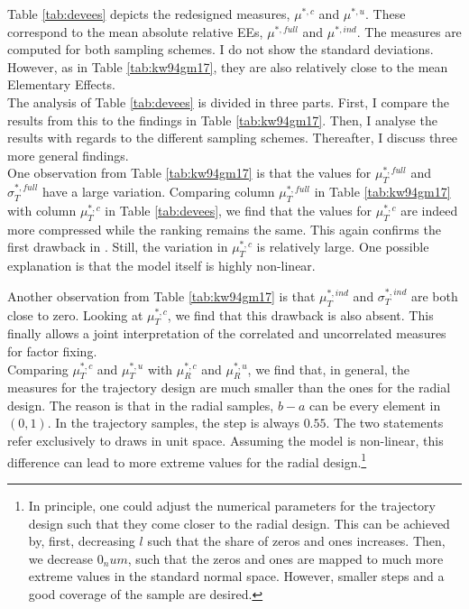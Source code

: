 \noindent
Table \ref{tab:devees} depicts the redesigned measures, $\mu^{*,c}$ and $\mu^{*,u}$. These correspond to the mean absolute relative EEs, $\mu^{*,full}$ and $\mu^{*,ind}$. The measures are computed for both sampling schemes. I do not show the standard deviations. However, as in Table \ref{tab:kw94gm17}, they are also relatively close to the mean Elementary Effects.\\

\noindent
The analysis of Table \ref{tab:devees} is divided in three parts. First, I compare the results from this to the findings in Table \ref{tab:kw94gm17}. Then, I analyse the results with regards to the different sampling schemes. Thereafter, I discuss three more general findings.\\

\noindent
One observation from Table \ref{tab:kw94gm17} is that the values for $\mu^{*,full}_T$ and $\sigma^{*,full}_T$ have a large variation. Comparing column $\mu^{*,full}_T$ in Table \ref{tab:kw94gm17} with column $\mu^{*,c}_T$ in Table \ref{tab:devees}, we find that the values for $\mu^{*,c}_T$ are indeed more compressed while the ranking remains the same. This again confirms the first drawback in \cite{ge2017extending}. Still, the variation in $\mu^{*,c}_T$ is relatively large. One possible explanation is that the model itself is highly non-linear.

Another observation from Table \ref{tab:kw94gm17} is that $\mu^{*,ind}_T$ and $\sigma^{*,ind}_T$ are both close to zero. Looking at $\mu^{*,c}_T$, we find that this drawback is also absent. This finally allows a joint interpretation of the correlated and uncorrelated measures for factor fixing.\\

\noindent
Comparing $\mu^{*,c}_T$ and $\mu^{*,u}_T$ with $\mu^{*,c}_R$ and $\mu^{*,u}_R$, we find that, in general, the measures for the trajectory design are much smaller than the ones for the radial design. The reason is that in the radial samples, $b-a$ can be every element in $(0,1)$. In the trajectory samples, the step is always $0.55$. The two statements refer exclusively to draws in unit space. Assuming the model is non-linear, this difference can lead to more extreme values for the radial design.\footnote{In principle, one could adjust the numerical parameters for the trajectory design such that they come closer to the radial design. This can be achieved by, first, decreasing $l$ such that the share of zeros and ones increases. Then, we decrease $0_num$, such that the zeros and ones are mapped to much more extreme values in the standard normal space. However, smaller steps and a good coverage of the sample are desired.}\\

